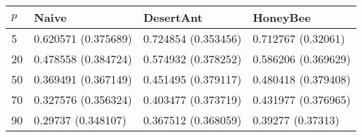 \begin{tabular} {|l|l|l|l|}
\hline
$p$ & Naive & DesertAnt & HoneyBee \\
\hline
5 & 0.620571 (0.375689)  & 0.724854 (0.353456)  & 0.712767 (0.32061)  \\
20 & 0.478558 (0.384724)  & 0.574932 (0.378252)  & 0.586206 (0.369629)  \\
50 & 0.369491 (0.367149)  & 0.451495 (0.379117)  & 0.480418 (0.379408)  \\
70 & 0.327576 (0.356324)  & 0.403477 (0.373719)  & 0.431977 (0.376965)  \\
90 & 0.29737 (0.348107)  & 0.367512 (0.368059)  & 0.39277 (0.37313)  \\
\hline
\end{tabular}
